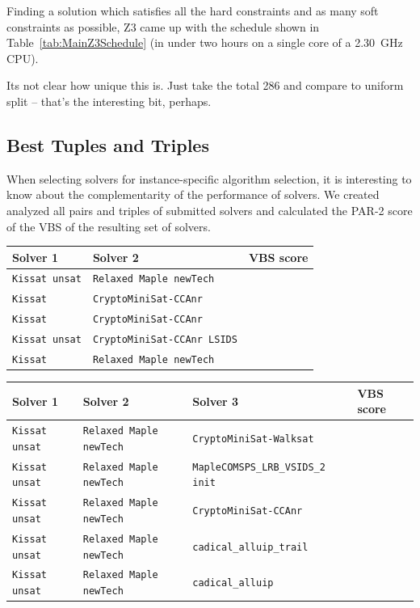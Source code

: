 \documentclass{elsarticle}
\newcommand{\solver}[1]{\texttt{#1}}
\begin{document}
Finding a solution which satisfies all the hard constraints and as many soft constraints as possible,
Z3 came up with the schedule shown in Table~\ref{tab:MainZ3Schedule} (in under two hours on a single core of a \SI{2.30}{\giga\hertz} CPU).


Its not clear how unique this is. Just take the total 286 and compare to uniform split -- that's the interesting bit, perhaps.

\subsection{Best Tuples and Triples}

When selecting solvers for instance-specific algorithm selection, it is interesting to know about the complementarity of the performance of solvers. 
We created analyzed all pairs and triples of submitted solvers and calculated the PAR-2 score of the VBS of the resulting set of solvers. 

\begin{table}
\centering
\begin{tabular}{|l|l|l|}
\hline
Solver 1 & Solver 2 & VBS score \\
\hline
\solver{Kissat unsat} & \solver{Relaxed Maple newTech} & \\
\solver{Kissat} & \solver{CryptoMiniSat-CCAnr} & \\
\solver{Kissat} & \solver{CryptoMiniSat-CCAnr} & \\
\solver{Kissat unsat} & \solver{CryptoMiniSat-CCAnr LSIDS} & \\
\solver{Kissat} & \solver{Relaxed Maple newTech} & \\
\hline
\end{tabular}
\end{table}


\begin{table}
\begin{tabular}{|l|l|l|l|}
\hline
Solver 1 & Solver 2 & Solver 3 & VBS score \\
\hline
\solver{Kissat unsat} & \solver{Relaxed Maple newTech} & \solver{CryptoMiniSat-Walksat} & \\
\solver{Kissat unsat} & \solver{Relaxed Maple newTech} & \solver{MapleCOMSPS\_LRB\_VSIDS\_2 init} &  \\
\solver{Kissat unsat} & \solver{Relaxed Maple newTech} & \solver{CryptoMiniSat-CCAnr} & \\
\solver{Kissat unsat} & \solver{Relaxed Maple newTech} & \solver{cadical\_alluip\_trail} & \\
\solver{Kissat unsat} & \solver{Relaxed Maple newTech} & \solver{cadical\_alluip} & \\
\hline
\end{tabular}
\end{table}
\end{document}
